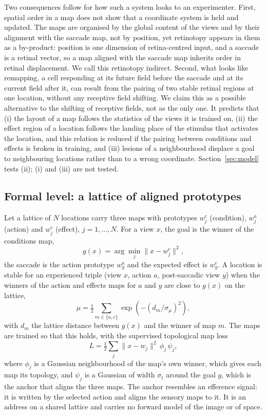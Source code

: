 \documentclass[14pt]{article}
\begin{document}
Two consequences follow for how such a system looks to an experimenter.
First, spatial order in a map does not show that a coordinate system is held and updated.
The maps are organised by the global content of the views and by their alignment with the saccade map, not by position, yet retinotopy appears in them as a by-product: position is one dimension of retina-centred input, and a saccade is a retinal vector, so a map aligned with the saccade map inherits order in retinal displacement.
We call this retinotopy indirect.
Second, what looks like remapping, a cell responding at its future field before the saccade and at its current field after it, can result from the pairing of two stable retinal regions at one location, without any receptive field shifting.
We claim this as a possible alternative to the shifting of receptive fields, not as the only one.
It predicts that (i) the layout of a map follows the statistics of the views it is trained on, (ii) the effect region of a location follows the landing place of the stimulus that activates the location, and this relation is reduced if the pairing between conditions and effects is broken in training, and (iii) lesions of a neighbourhood displace a goal to neighbouring locations rather than to a wrong coordinate.
Section~\ref{sec:model} tests (ii); (i) and (iii) are not tested.

\subsection{Formal level: a lattice of aligned prototypes}
\label{sec:formal}

Let a lattice of $N$ locations carry three maps with prototypes $w^{c}_j$ (condition), $w^{a}_j$ (action) and $w^{e}_j$ (effect), $j=1,\dots,N$.
For a view $x$, the goal is the winner of the conditions map,
\begin{equation}
g(x)=\arg\min_j \lVert x-w^{c}_j\rVert^2 ,
\end{equation}
the saccade is the action prototype $w^{a}_{g}$ and the expected effect is $w^{e}_{g}$.
A location is stable for an experienced triple (view $x$, action $a$, post-saccadic view $y$) when the winners of the action and effects maps for $a$ and $y$ are close to $g(x)$ on the lattice,
\begin{equation}
\mu=\tfrac12\sum_{m\in\{a,e\}}\exp\!\left(-(d_m/\sigma_\mu)^2\right),
\end{equation}
with $d_m$ the lattice distance between $g(x)$ and the winner of map $m$.
The maps are trained so that this holds, with the supervised topological map loss
\begin{equation}
L=\tfrac12\sum_j \lVert x-w_j\rVert^2\,\phi_j\,\psi_j ,
\end{equation}
where $\phi_j$ is a Gaussian neighbourhood of the map's own winner, which gives each map its topology, and $\psi_j$ is a Gaussian of width $\sigma_t$ around the goal $g$, which is the anchor that aligns the three maps.
The anchor resembles an efference signal: it is written by the selected action and aligns the sensory maps to it.
It is an address on a shared lattice and carries no forward model of the image or of space.
\end{document}
